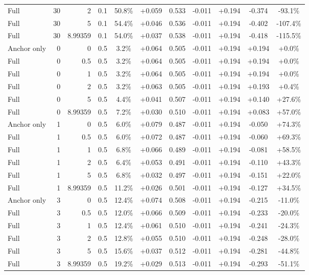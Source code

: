 \begin{table}[htbp]
\begin{tabular}{lrrrccccccc}
Full & 30 & 2 & 0.1 & 50.8\% & +0.059 & 0.533 & -0.011 & +0.194 & -0.374 & -93.1\% \\
Full & 30 & 5 & 0.1 & 54.4\% & +0.046 & 0.536 & -0.011 & +0.194 & -0.402 & -107.4\% \\
Full & 30 & 8.99359 & 0.1 & 54.0\% & +0.037 & 0.538 & -0.011 & +0.194 & -0.418 & -115.5\% \\
Anchor only & 0 & 0 & 0.5 & 3.2\% & +0.064 & 0.505 & -0.011 & +0.194 & +0.194 & +0.0\% \\
Full & 0 & 0.5 & 0.5 & 3.2\% & +0.064 & 0.505 & -0.011 & +0.194 & +0.194 & +0.0\% \\
Full & 0 & 1 & 0.5 & 3.2\% & +0.064 & 0.505 & -0.011 & +0.194 & +0.194 & +0.0\% \\
Full & 0 & 2 & 0.5 & 3.2\% & +0.063 & 0.505 & -0.011 & +0.194 & +0.193 & +0.4\% \\
Full & 0 & 5 & 0.5 & 4.4\% & +0.041 & 0.507 & -0.011 & +0.194 & +0.140 & +27.6\% \\
Full & 0 & 8.99359 & 0.5 & 7.2\% & +0.030 & 0.510 & -0.011 & +0.194 & +0.083 & +57.0\% \\
Anchor only & 1 & 0 & 0.5 & 6.0\% & +0.079 & 0.487 & -0.011 & +0.194 & -0.050 & +74.3\% \\
Full & 1 & 0.5 & 0.5 & 6.0\% & +0.072 & 0.487 & -0.011 & +0.194 & -0.060 & +69.3\% \\
Full & 1 & 1 & 0.5 & 6.8\% & +0.066 & 0.489 & -0.011 & +0.194 & -0.081 & +58.5\% \\
Full & 1 & 2 & 0.5 & 6.4\% & +0.053 & 0.491 & -0.011 & +0.194 & -0.110 & +43.3\% \\
Full & 1 & 5 & 0.5 & 6.8\% & +0.032 & 0.497 & -0.011 & +0.194 & -0.151 & +22.0\% \\
Full & 1 & 8.99359 & 0.5 & 11.2\% & +0.026 & 0.501 & -0.011 & +0.194 & -0.127 & +34.5\% \\
Anchor only & 3 & 0 & 0.5 & 12.4\% & +0.074 & 0.508 & -0.011 & +0.194 & -0.215 & -11.0\% \\
Full & 3 & 0.5 & 0.5 & 12.0\% & +0.066 & 0.509 & -0.011 & +0.194 & -0.233 & -20.0\% \\
Full & 3 & 1 & 0.5 & 12.4\% & +0.061 & 0.510 & -0.011 & +0.194 & -0.241 & -24.3\% \\
Full & 3 & 2 & 0.5 & 12.8\% & +0.055 & 0.510 & -0.011 & +0.194 & -0.248 & -28.0\% \\
Full & 3 & 5 & 0.5 & 15.6\% & +0.037 & 0.512 & -0.011 & +0.194 & -0.281 & -44.8\% \\
Full & 3 & 8.99359 & 0.5 & 19.2\% & +0.029 & 0.513 & -0.011 & +0.194 & -0.293 & -51.1\% \\

\end{tabular}
\end{table}
